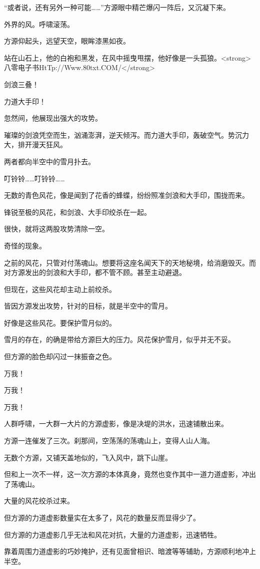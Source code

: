 \begin{this_body}
“或者说，还有另外一种可能……”方源眼中精芒爆闪一阵后，又沉凝下来。

外界的风。呼啸滚荡。

方源仰起头，远望天空，眼眸漆黑如夜。

站在山石上，他的白袍和黑发，在风中摇曳甩摆，他好像是一头孤狼。<strong>八零电子书HtTp://Www.80txt.COM/</strong>

剑浪三叠！

力道大手印！

忽然间，他展现出强大的攻势。

璀璨的剑浪凭空而生，汹涌澎湃，逆天倾泻。而力道大手印，轰破空气。势沉力大，排开漫天狂风。

两者都向半空中的雪月扑去。

叮铃铃……叮铃铃……

无数的青色风花，像是闻到了花香的蜂蝶，纷纷照准剑浪和大手印，围拢而来。

锋锐至极的风花，和剑浪、大手印绞杀在一起。

很快，就将这两股攻势清除一空。

奇怪的现象。

之前的风花，只管对付荡魂山。想要将这座名闻天下的天地秘境，给消磨毁灭。而对方源发出的剑浪和大手印，都不管不顾。甚至主动避退。

但现在，这些风花却主动上前绞杀。

皆因方源发出攻势，针对的目标，就是半空中的雪月。

好像是这些风花。要保护雪月似的。

雪月的存在，的确是带给方源巨大的压力。风花保护雪月，似乎并无不妥。

但方源的脸色却闪过一抹振奋之色。

万我！

万我！

万我！

人群呼啸，一大群一大片的方源虚影，像是决堤的洪水，迅速铺散出来。

方源一连催发了三次。刹那间，空荡荡的荡魂山上，变得人山人海。

无数个方源，又铺天盖地似的，飞入风中，跳下山崖。

但和上一次不一样，这一次方源的本体真身，竟然也变作其中一道力道虚影，冲出了荡魂山。

大量的风花绞杀过来。

但方源的力道虚影数量实在太多了，风花的数量反而显得少了。

但方源的力道虚影几乎无法和风花对抗，大量的力道虚影，迅速牺牲。

靠着周围力道虚影的巧妙掩护，还有见面曾相识、暗渡等等辅助，方源顺利地冲上半空。


\end{this_body}
